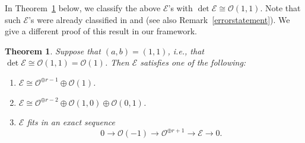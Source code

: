 \documentclass[a4paper,12pt]{amsart}
\newtheorem{thm}{Theorem}[section]
\begin{document}
In Theorem~\ref{Chern1surface} below,
we classify
the above $\mathcal{E}$'s
with $\det\mathcal{E}\cong \mathcal{O}(1,1)$.
Note that such $\mathcal{E}$'s 
were already classified in \cite[\S 3]{swCompo}
and \cite[\S 2 Lemmas 1 and 2]{pswnef}
(see also Remark~\ref{errorstatement}).
We give a different proof 
of this result
in our framework.

\begin{thm}\label{Chern1surface}
Suppose that 
$(a,b)=(1,1)$, i.e.,
that $\det\mathcal{E}\cong \mathcal{O}(1,1)=\mathcal{O}(1)$.
Then 
$\mathcal{E}$
satisfies
one of the following:
\begin{enumerate}
\item $\mathcal{E}\cong\mathcal{O}^{\oplus r-1}\oplus\mathcal{O}(1)$.
\item $\mathcal{E}\cong \mathcal{O}^{\oplus r-2}\oplus\mathcal{O}(1,0)\oplus\mathcal{O}(0,1)$.
\item $\mathcal{E}$ fits in an exact sequence
\[0\to\mathcal{O}(-1)\to\mathcal{O}^{\oplus r+1}\to \mathcal{E}\to 0.\]
\end{enumerate}
\end{thm}
\end{document}
